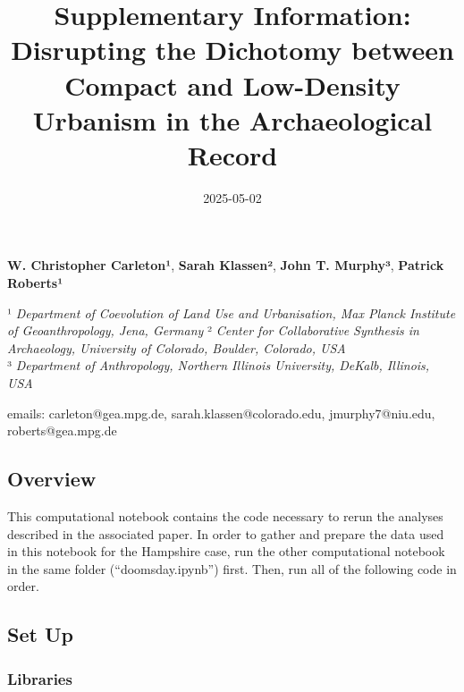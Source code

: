 \documentclass[
  11pt,
  letterpaper,
  DIV=11,
  numbers=noendperiod]{scrartcl}
\title{Supplementary Information: Disrupting the Dichotomy between
Compact and Low-Density Urbanism in the Archaeological Record}
\author{}
\date{2025-05-02}
\begin{document}
\maketitle

\textbf{W. Christopher Carleton¹}, \textbf{Sarah Klassen²}, \textbf{John
T. Murphy³}, \textbf{Patrick Roberts¹}

¹ \emph{Department of Coevolution of Land Use and Urbanisation, Max
Planck Institute of Geoanthropology, Jena, Germany} ² \emph{Center for
Collaborative Synthesis in Archaeology, University of Colorado, Boulder,
Colorado, USA}\\
³ \emph{Department of Anthropology, Northern Illinois University,
DeKalb, Illinois, USA}

emails: carleton@gea.mpg.de, sarah.klassen@colorado.edu,
jmurphy7@niu.edu, roberts@gea.mpg.de

\subsection{Overview}\label{overview}

This computational notebook contains the code necessary to rerun the
analyses described in the associated paper. In order to gather and
prepare the data used in this notebook for the Hampshire case, run the
other computational notebook in the same folder (``doomsday.ipynb'')
first. Then, run all of the following code in order.

\subsection{Set Up}\label{set-up}

\subsubsection{Libraries}\label{libraries}
\end{document}
